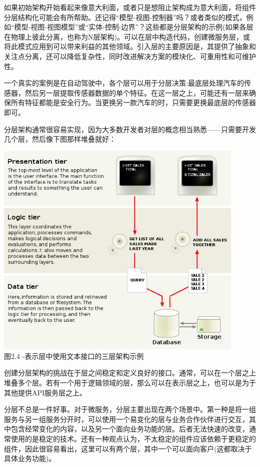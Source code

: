 

如果初始架构开始看起来像意大利面，或者只是想阻止架构成为意大利面，将组件分层结构化可能会有所帮助。还记得“模型-视图-控制器”吗？或者类似的模式，例如“模型-视图-视图模型”或“实体-控制-边界”？这些都是分层架构的示例(如果各层在物理上彼此分离，也称为N层架构)。可以在层中构造代码，创建微服务层，或将此模式应用到可以带来利益的其他领域。引入层的主要原因是，其提供了抽象和关注点分离，还可以降低复杂性，同时改进解决方案的模块化、可重用性和可维护性。

一个真实的案例是在自动驾驶中，各个层可以用于分层决策:最底层处理汽车的传感器，然后另一层提取传感器数据的单个特征。在这一层之上，可能还有一层来确保所有特征都能是安全行为。当更换另一款汽车的时，只需要更换最底层的传感器即可。

分层架构通常很容易实现，因为大多数开发者对层的概念相当熟悉——只需要开发几个层，然后像下图那样堆叠就好：

\begin{center}
\includegraphics[width=0.9\textwidth]{content/1/chapter2/images/4.jpg}\\
图2.4 -表示层中使用文本接口的三层架构示例
\end{center}

创建分层架构的挑战在于层之间稳定和定义良好的接口。通常，可以在一个层之上堆叠多个层。若有一个用于逻辑领域的层，那么可以在表示层之上，也可以是为于其他提供API服务层之上。

分层不总是一件好事。对于微服务，分层主要出现在两个场景中。第一种是将一组服务与另一组服务分开时，可以使用一个易变化的层与业务合作伙伴进行交互，其中包含经常变化的内容，以及另一个面向业务功能的层。后者无法快速的改变，通常使用的是稳定的技术。还有一种观点认为，不太稳定的组件应该依赖于更稳定的组件，因此很容易看出，这里可以有两个层，其中一个可以面向客户(这都取决于具体业务功能)。

